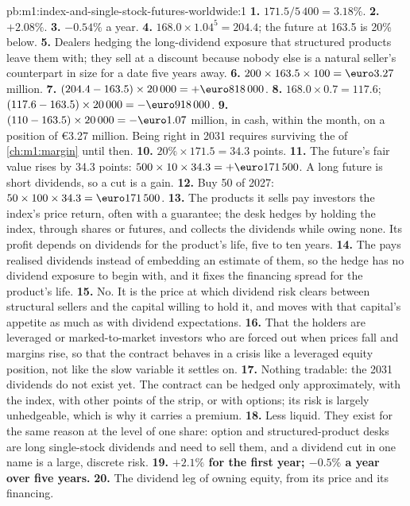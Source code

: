 \begin{solution}{pb:m1:index-and-single-stock-futures-worldwide:1}
\textbf{1.} $171.5/5\,400 = 3.18\%$.
\textbf{2.} $+2.08\%$.
\textbf{3.} $-0.54\%$ a year.
\textbf{4.} $168.0 \times 1.04^5 = 204.4$; the future at 163.5 is 20\% below.
\textbf{5.} Dealers hedging the long-dividend exposure that structured
products leave them with; they sell at a discount because nobody else is a
natural seller's counterpart in size for a date five years away.
\textbf{6.} $200 \times 163.5 \times 100 = \text{\euro}3.27$ million.
\textbf{7.} $(204.4 - 163.5) \times 20\,000 = +\text{\euro}818\,000$.
\textbf{8.} $168.0 \times 0.7 = 117.6$; $(117.6 - 163.5) \times 20\,000 =
-\text{\euro}918\,000$.
\textbf{9.} $(110 - 163.5) \times 20\,000 = -\text{\euro}1.07$ million, in
cash, within the month, on a position of \euro3.27 million. Being right in 2031
requires surviving the  of \cref{ch:m1:margin} until then.
\textbf{10.} $20\% \times 171.5 = 34.3$ points.
\textbf{11.} The future's fair value rises by 34.3 points: $500 \times 10
\times 34.3 = +\text{\euro}171\,500$. A long future is short dividends, so a
cut is a gain.
\textbf{12.} Buy 50  of 2027: $50 \times 100 \times 34.3 =
\text{\euro}171\,500$.
\textbf{13.} The products it sells pay investors the index's price return,
often with a guarantee; the desk hedges by holding the index, through shares
or futures, and collects the dividends while owing none. Its profit depends
on dividends for the product's life, five to ten years.
\textbf{14.} The  pays realised dividends instead of
embedding an estimate of them, so the hedge has no dividend exposure to
begin with, and it fixes the financing spread for the product's life.
\textbf{15.} No. It is the price at which dividend risk clears between
structural sellers and the capital willing to hold it, and moves with that
capital's appetite as much as with dividend expectations.
\textbf{16.} That the holders are leveraged or marked-to-market investors who
are forced out when prices fall and margins rise, so that the contract
behaves in a crisis like a leveraged equity position, not like the slow
variable it settles on.
\textbf{17.} Nothing tradable: the 2031 dividends do not exist yet. The
contract can be hedged only approximately, with the index, with other
points of the strip, or with options; its risk is largely unhedgeable, which
is why it carries a premium.
\textbf{18.} Less liquid. They exist for the same reason at the level of one
share: option and structured-product desks are long single-stock dividends
and need to sell them, and a dividend cut in one name is a large, discrete
risk.
\textbf{19.} \textbf{$+2.1\%$ for the first year; $-0.5\%$ a year over five
years.}
\textbf{20.} The dividend leg of owning equity, from its price and its
financing.
\end{solution}

